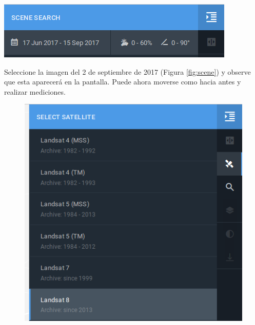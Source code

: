 \documentclass[a4paper,12pt]{book}
\begin{document}
\begin{center}\includegraphics[scale=0.4]{in:nubes.png}\end{center}

Seleccione la imagen del 2 de septiembre de 2017 (Figura \ref{fig:scene}) y observe que esta aparecerá en la pantalla. Puede ahora moverse como hacia antes y realizar mediciones.

\begin{figure}[h!]
\centering
\begin{minipage}{.425\linewidth}
  \includegraphics[width=\linewidth]{fig:sat.png}
\end{minipage}
\hspace{.05\linewidth}
\begin{minipage}{.425\linewidth}

\end{minipage}
\end{figure}
\end{document}
